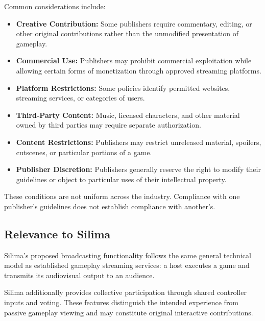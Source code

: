 Common considerations include:
\begin{itemize}
    \item \textbf{Creative Contribution:}
          Some publishers require commentary, editing,
          or other original contributions rather than
          the unmodified presentation of gameplay.

    \item \textbf{Commercial Use:}
          Publishers may prohibit commercial exploitation
          while allowing certain forms of monetization
          through approved streaming platforms.

    \item \textbf{Platform Restrictions:}
          Some policies identify permitted websites,
          streaming services, or categories of users.

    \item \textbf{Third-Party Content:}
          Music, licensed characters, and other material
          owned by third parties may require separate
          authorization.

    \item \textbf{Content Restrictions:}
          Publishers may restrict unreleased material,
          spoilers, cutscenes, or particular portions
          of a game.

    \item \textbf{Publisher Discretion:}
          Publishers generally reserve the right to
          modify their guidelines or object to
          particular uses of their intellectual property.
\end{itemize}

These conditions are not uniform across the industry.
Compliance with one publisher's guidelines does not
establish compliance with another's.

\subsection{Relevance to Silima}

Silima's proposed broadcasting functionality follows
the same general technical model as established
gameplay streaming services: a host executes a game
and transmits its audiovisual output to an audience.

Silima additionally provides collective participation
through shared controller inputs and voting. These
features distinguish the intended experience from
passive gameplay viewing and may constitute original
interactive contributions.

